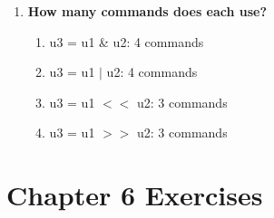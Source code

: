 \documentclass{article}
\begin{document}
\begin{enumerate}[label=\textbf{\arabic*})]
    \item \textbf{How many commands does each use?} \\
    
    \begin{enumerate}[label=\textbf{\alph*}.]
        \item u3 = u1 \& u2: 4 commands
        \item u3 = u1 $|$ u2: 4 commands
        \item u3 = u1 $<<$ u2: 3 commands
        \item u3 = u1 $>>$ u2: 3 commands
    \end{enumerate}


    

\end{enumerate}

\section*{Chapter 6 Exercises}
\end{document}
